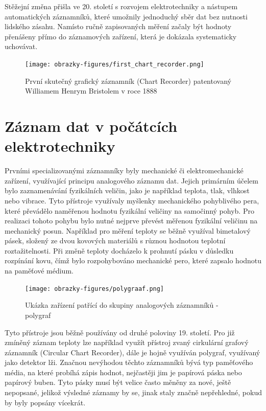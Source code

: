 Stěžejní změna přišla ve 20. století s rozvojem elektrotechniky a nástupem automatických záznamníků, které umožnily jednoduchý sběr dat bez nutnosti lidského zásahu. Namísto ručně zapisovaných měření začaly být hodnoty přenášeny přímo do záznamových zařízení, která je dokázala systematicky uchovávat. \cite{origin_of_chart_recorders}

\begin{figure}[h] %
    \centering
    \texttt{[image: obrazky-figures/first\_chart\_recorder.png]}
    \caption{První skutečný grafický záznamník (Chart Recorder) patentovaný Williamem Henrym Bristolem v roce 1888 \cite{bristol_chart_recorders}}
    \label{fig:chart_recorder}
\end{figure}

\section{Záznam dat v počátcích elektrotechniky}
\label{zaznam}
Prvními specializovanými záznamníky byly mechanické či elektromechanické zařízení, využívající principu analogového záznamu dat. Jejich primárním účelem bylo zaznamenávání fyzikálních veličin, jako je například teplota, tlak, vlhkost nebo vibrace. Tyto přístroje využívaly myšlenky mechanického pohyblivého pera, které převádělo naměřenou hodnotu fyzikální veličiny na samočinný pohyb. Pro realizaci tohoto pohybu bylo nutné nejprve převést měřenou fyzikální veličinu na mechanický posun. Například pro měření teploty se běžně využíval bimetalový pásek, složený ze dvou kovových materiálů s různou hodnotou teplotní roztažitelnosti. Při změně teploty docházelo k prohnutí pásku v důsledku rozpínání kovu, čímž bylo rozpohybováno mechanické pero, které zapsalo hodnotu na paměťové médium. 


\begin{figure}[h] %
    \centering
    \texttt{[image: obrazky-figures/polygraaf.png]}
    \caption{Ukázka zařízení patřící do skupiny analogových záznamníků - polygraf \cite{polygraph_picture}}
    \label{fig:polygraaf}
\end{figure}


Tyto přístroje jsou běžně používány od druhé poloviny 19. století. Pro již zmíněný záznam teploty lze například využít přístroj zvaný cirkulární grafový záznamník (Circular Chart Recorder), dále je hojně využíván polygraf, využívaný jako detektor lži. Značnou nevýhodou těchto záznamníků bývá typ paměťového média, na které probíhá zápis hodnot, nejčastěji jim je papírová páska nebo papírový buben. Tyto pásky musí být velice často měněny za nové, ještě nepopsané, jelikož výsledné záznamy by se, jinak staly značně nepřehledné, pokud by byly popsány vícekrát. \cite{origin_of_chart_recorders}

